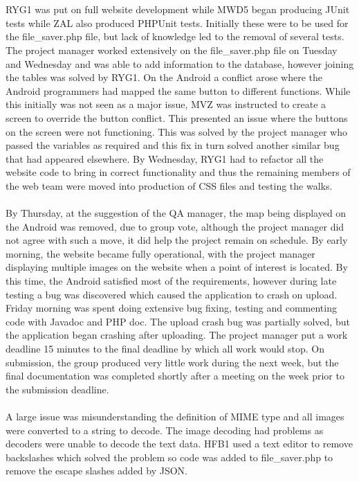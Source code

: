 \documentclass[12pt]{article}
\begin{document}
\\\\
RYG1 was put on full website development while MWD5 began producing JUnit tests while ZAL also produced PHPUnit tests. Initially these were to be used for the file\_saver.php file, but lack of knowledge led to the removal of several tests. The project manager worked extensively on the file\_saver.php file on Tuesday and Wednesday and was able to add information to the database, however joining the tables was solved by RYG1. On the Android a conflict arose where the Android programmers had mapped the same button to different functions. While this initially was not seen as a major issue, MVZ was instructed to create a screen to override the button conflict. This presented an issue where the buttons on the screen were not functioning. This was solved by the project manager who passed the variables as required and this fix in turn solved another similar bug that had appeared elsewhere. By Wednesday, RYG1 had to refactor all the website code to bring in correct functionality and thus the remaining members of the web team were moved into production of CSS files and testing the walks. \\\\
By Thursday, at the suggestion of the QA manager, the map being displayed on the Android was removed, due to group vote, although the project manager did not agree with such a move, it did help the project remain on schedule. By early morning, the website became fully operational, with the project manager displaying multiple images on the website when a point of interest is located. By this time, the Android satisfied most of the requirements, however during late testing a bug was discovered which caused the application to crash on upload. Friday morning was spent doing extensive bug fixing, testing and commenting code with Javadoc and PHP doc. The upload crash bug was partially solved, but the application began crashing after uploading. The project manager put a work deadline 15 minutes to the final deadline by which all work would stop. On submission, the group produced very little work during the next week, but the final documentation was completed shortly after a meeting on the week prior to the submission deadline.
\\\\
A large issue was misunderstanding the definition of MIME type and all images were converted to a string to decode. The image decoding had problems as decoders were unable to decode the text data. HFB1 used a text editor to remove backslashes which solved the problem so code was added to file\_saver.php to remove the escape slashes added by JSON.
\newpage 
\end{document}
